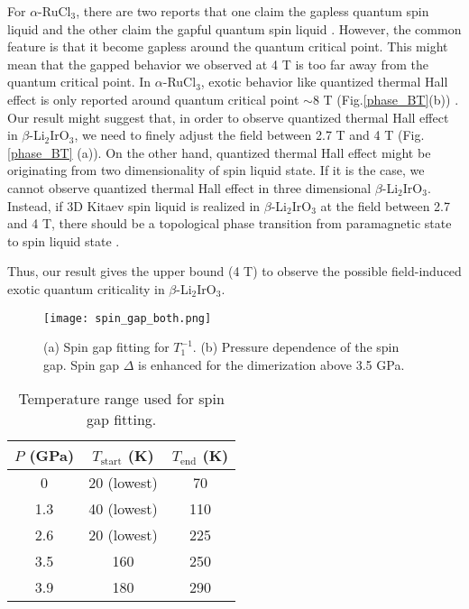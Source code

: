 \documentclass[a4,10.5pt]{report}
\begin{document}
For $\alpha$-RuCl$_3$, there are two reports that one claim the gapless quantum spin liquid \cite{Zheng2017} and the other claim the gapful quantum spin liquid \cite{baek2017evidence}.
However, the common feature is that it become gapless around the quantum critical point.
This might mean that the gapped behavior we observed at 4 T is too far away from the quantum critical point.
In $\alpha$-RuCl$_3$, exotic behavior like quantized thermal Hall effect is only reported around quantum critical point $\sim 8$ T (Fig.\ref{phase_BT}(b)) \cite{kasahara2018majorana}.
Our result might suggest that, in order to observe quantized thermal Hall effect in $\beta$-Li$_2$IrO$_3$, we need to finely adjust the field between 2.7 T and 4 T 
(Fig.\ref{phase_BT} (a)).
On the other hand, quantized thermal Hall effect might be originating from two dimensionality of spin liquid state.
If it is the case, we cannot observe quantized thermal Hall effect in three dimensional $\beta$-Li$_2$IrO$_3$.
Instead, if 3D Kitaev spin liquid is realized in $\beta$-Li$_2$IrO$_3$ at the field between 2.7 and 4 T, there should be a topological phase transition from paramagnetic state to
spin liquid state \cite{nasu2014vaporization}.

Thus, our result gives the upper bound (4 T) to observe the possible field-induced exotic quantum criticality in $\beta$-Li$_2$IrO$_3$.

\begin{figure}
  \centering
  \texttt{[image: spin\_gap\_both.png]}
  \caption{(a) Spin gap fitting for $T^{-1}_1$.
  (b) Pressure dependence of the spin gap.
  Spin gap $\Delta$ is enhanced for the dimerization above 3.5 GPa.} 
  \label{spin_gap}
\end{figure}

\begin{table}[H]
\begin{center}
\caption{Temperature range used for spin gap fitting.}
\begin{tabular}{ccc} \hline
 $P$ (GPa)& $T_\mathrm{start}$ (K)& $T_\mathrm{end}$ (K)\\ \hline
 0 & 20 (lowest)& 70\\ \hline
 1.3& 40 (lowest)& 110\\ \hline
 2.6& 20 (lowest)& 225\\ \hline
 3.5& 160& 250\\ \hline
 3.9& 180& 290\\ \hline
\end{tabular}
\label{Trange}
\end{center}
\end{table}
\end{document}
